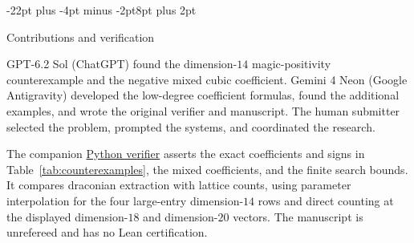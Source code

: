 \documentclass[11pt,letterpaper]{article}
\makeatletter
\renewcommand{\section}{\@startsection{section}{1}{\z@}%
  {-22pt plus -4pt minus -2pt}{8pt plus 2pt}%
  {\normalfont\fontsize{14}{17}\selectfont\bfseries\raggedright}}
\theoremstyle{result}
\theoremstyle{remark}
\makeatother
\begin{document}
\begin{samepage}
\section{Contributions and verification}
\label{sec:attribution}

GPT-6.2 Sol (ChatGPT) found the dimension-$14$ magic-positivity counterexample and the negative mixed cubic coefficient. Gemini 4 Neon (Google Antigravity) developed the low-degree coefficient formulas, found the additional examples, and wrote the original verifier and manuscript. The human submitter selected the problem, prompted the systems, and coordinated the research.

The companion \href{https://github.com/CosmicCrusader23/mathslopslopslop/blob/284813d9a069ae81b3510376332afc7060895be4/disproved/hill-luo-trinh-vindas-melendez-conj-8.1-counterexample/verify.py}{Python verifier} asserts the exact coefficients and signs in Table~\ref{tab:counterexamples}, the mixed coefficients, and the finite search bounds. It compares draconian extraction with lattice counts, using parameter interpolation for the four large-entry dimension-$14$ rows and direct counting at the displayed dimension-$18$ and dimension-$20$ vectors. The manuscript is unrefereed and has no Lean certification.
\end{samepage}
\end{document}
